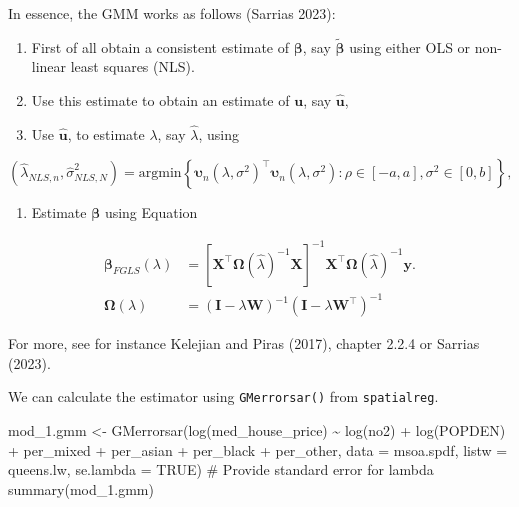 \documentclass[
  letterpaper,
  DIV=11,
  numbers=noendperiod]{scrreprt}
\newenvironment{Shaded}{\begin{snugshade}}{\end{snugshade}}
\newcommand{\AttributeTok}[1]{\textcolor[rgb]{0.40,0.45,0.13}{#1}}
\newcommand{\CommentTok}[1]{\textcolor[rgb]{0.37,0.37,0.37}{#1}}
\newcommand{\ConstantTok}[1]{\textcolor[rgb]{0.56,0.35,0.01}{#1}}
\newcommand{\FunctionTok}[1]{\textcolor[rgb]{0.28,0.35,0.67}{#1}}
\newcommand{\NormalTok}[1]{\textcolor[rgb]{0.00,0.23,0.31}{#1}}
\newcommand{\OtherTok}[1]{\textcolor[rgb]{0.00,0.23,0.31}{#1}}
\newcommand{\SpecialCharTok}[1]{\textcolor[rgb]{0.37,0.37,0.37}{#1}}
\providecommand{\tightlist}{%
  \setlength{\itemsep}{0pt}\setlength{\parskip}{0pt}}\usepackage{longtable,booktabs,array}
\begin{document}
In essence, the GMM works as follows (Sarrias 2023):

\begin{enumerate}
\def\labelenumi{\arabic{enumi})}
\item
  First of all obtain a consistent estimate of
  \(\boldsymbol{\mathbf{\beta}}\), say
  \(\widetilde{\boldsymbol{\mathbf{\beta}}}\) using either OLS or
  non-linear least squares (NLS).
\item
  Use this estimate to obtain an estimate of
  \(\boldsymbol{\mathbf{u}}\), say
  \(\widehat{\boldsymbol{\mathbf{u}}}\),
\item
  Use \(\widehat{\boldsymbol{\mathbf{u}}}\), to estimate \(\lambda\),
  say \(\widehat{\lambda}\), using
\end{enumerate}

\[
  (\widehat{\lambda}_{NLS, n}, \widehat{\sigma}^2_{NLS, N}) = \mathrm{argmin} \left\lbrace \boldsymbol{\mathbf{\upsilon}}_n(\lambda, \sigma^2)^\top\boldsymbol{\mathbf{\upsilon}}_n(\lambda, \sigma^2): \rho \in [-a, a], \sigma^2\in [0, b]\right\rbrace, 
\]

\begin{enumerate}
\def\labelenumi{\arabic{enumi})}
\setcounter{enumi}{3}
\tightlist
\item
  Estimate \(\boldsymbol{\mathbf{\beta}}\) using Equation
\end{enumerate}

\[
\begin{split}
\boldsymbol{\mathbf{\beta}}_{FGLS}(\lambda) &=\left[\boldsymbol{\mathbf{X}}^\top\boldsymbol{\mathbf{\Omega}}(\widehat{\lambda})^{-1}\boldsymbol{\mathbf{X}}\right]^{-1}\boldsymbol{\mathbf{X}}^\top\boldsymbol{\mathbf{\Omega}}(\widehat{\lambda})^{-1}\boldsymbol{\mathbf{y}}.\\
\boldsymbol{\mathbf{\Omega}}(\lambda) &= (\boldsymbol{\mathbf{I}} - \lambda\boldsymbol{\mathbf{W}})^{-1}(\boldsymbol{\mathbf{I}} - \lambda\boldsymbol{\mathbf{W}}^\top)^{-1}
\end{split}
\]

For more, see for instance Kelejian and Piras (2017), chapter 2.2.4 or
Sarrias (2023).

We can calculate the estimator using \texttt{GMerrorsar()} from
\texttt{spatialreg}.

\begin{Shaded}
\begin{Highlighting}[]
\NormalTok{mod\_1.gmm }\OtherTok{\textless{}{-}} \FunctionTok{GMerrorsar}\NormalTok{(}\FunctionTok{log}\NormalTok{(med\_house\_price) }\SpecialCharTok{\textasciitilde{}} \FunctionTok{log}\NormalTok{(no2) }\SpecialCharTok{+} \FunctionTok{log}\NormalTok{(POPDEN) }\SpecialCharTok{+} 
\NormalTok{                     per\_mixed }\SpecialCharTok{+}\NormalTok{ per\_asian }\SpecialCharTok{+}\NormalTok{ per\_black }\SpecialCharTok{+}\NormalTok{ per\_other,  }
                   \AttributeTok{data =}\NormalTok{ msoa.spdf, }
                   \AttributeTok{listw =}\NormalTok{ queens.lw,}
                   \AttributeTok{se.lambda =} \ConstantTok{TRUE}\NormalTok{) }\CommentTok{\# Provide standard error for lambda}
\FunctionTok{summary}\NormalTok{(mod\_1.gmm)}
\end{Highlighting}
\end{Shaded}
\end{document}
